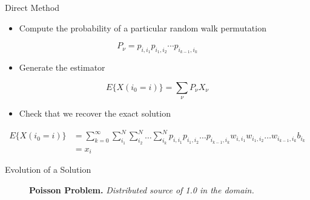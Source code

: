 \documentclass{beamer}
\begin{document}
\begin{frame}{Direct Method}

  \begin{itemize}
  \item Compute the probability of a particular random walk
    permutation
  \end{itemize}

  \[
  P_{\nu} = p_{i,i_1} p_{i_1,i_2} \cdots p_{i_{k-1},i_k}
  \]

  \begin{itemize}
  \item Generate the estimator
  \end{itemize}

  \[
  E\{X(i_0 = i)\} = \sum_{\nu} P_{\nu} X_{\nu}
  \]

  \begin{itemize}
  \item Check that we recover the exact solution
  \end{itemize}
  
  {\small
  \[
  \begin{split}
    E\{X(i_0 = i)\}
    &=\sum_{k=0}^{\infty}\sum_{i_1}^{N}\sum_{i_2}^{N}\ldots
    \sum_{i_k}^{N} p_{i,i_1}p_{i_1,i_2}\ldots p_{i_{k-1},i_k}
    w_{i,i_1}w_{i_1,i_2}\ldots w_{i_{k-1},i_k} b_{i_k}\\ &= x_i
  \end{split}
  \]
  }

\end{frame}

\begin{frame}{Evolution of a Solution}

  \begin{figure}[htpb!]
    \begin{center}
      \scalebox{1.0}{  }
    \end{center}
    \caption{\textbf{Poisson Problem.}
      \textit{Distributed source of 1.0 in the domain.}}
  \end{figure}

\end{frame}
\end{document}
